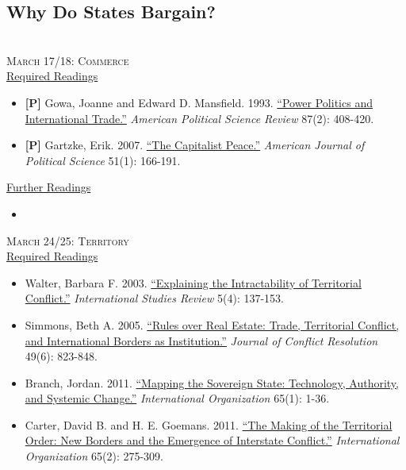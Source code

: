 \documentclass[11pt]{article}
\begin{document}
\vspace{2mm}
\subsection*{Why Do States Bargain?}

~\\
\textsc{March 17/18: Commerce} \\

\noindent \underline{Required Readings}

\begin{itemize}
\item \textbf{[P]} Gowa, Joanne and Edward D. Mansfield. 1993. \href{http://www.jstor.org/stable/2939050}{``Power Politics and International Trade.''} \textit{American Political Science Review} 87(2): 408-420.
\item \textbf{[P]} Gartzke, Erik. 2007. \href{http://onlinelibrary.wiley.com/doi/10.1111/j.1540-5907.2007.00244.x/abstract}{``The Capitalist Peace.''} \textit{American Journal of Political Science} 51(1): 166-191.
\end{itemize}

\noindent \underline{Further Readings}

\begin{itemize}
\item 
\end{itemize}


\noindent \textsc{March 24/25: Territory} \\

\noindent \underline{Required Readings}

\begin{itemize}
\item Walter, Barbara F. 2003. \href{http://onlinelibrary.wiley.com/doi/10.1111/j.1079-1760.2003.00504012.x/abstract}{``Explaining the Intractability of Territorial Conflict.''} \textit{International Studies Review} 5(4): 137-153.
\item Simmons, Beth A. 2005. \href{http://www.jstor.org/stable/30045138}{``Rules over Real Estate: Trade, Territorial Conflict, and International Borders as Institution.''} \textit{Journal of Conflict Resolution} 49(6): 823-848.
\item Branch, Jordan. 2011. \href{http://www.jstor.org/stable/23016102}{``Mapping the Sovereign State: Technology, Authority, and Systemic Change.''} \textit{International Organization} 65(1): 1-36.
\item Carter, David B. and H. E. Goemans. 2011. \href{http://www.jstor.org/stable/23016813}{``The Making of the Territorial Order: New Borders and the Emergence of Interstate Conflict.''} \textit{International Organization} 65(2): 275-309.
\end{itemize}
\end{document}
